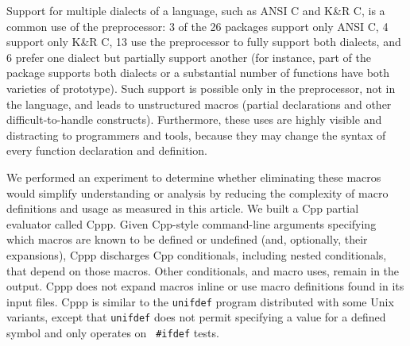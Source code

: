\documentclass[10pt]{article}
\def\typeofdocument{article}    %
\def\numpackages{26}
\newcommand{\pkg}[1]{\textsf{#1}}
\begin{document}

%

Support for multiple dialects of a language, such as ANSI C and K\&R C, is
a common use of the preprocessor:  3 of the {\numpackages} packages support
only ANSI C, 4 support only K\&R C, 13 use the preprocessor to fully
support both dialects, and 6 prefer one dialect but partially support
another (for instance, part of the package supports both dialects or a
substantial number of functions have both varieties of prototype).  Such
support is possible only in the preprocessor, not in the language, and
leads to unstructured macros (partial declarations and other
difficult-to-handle constructs).  Furthermore, these uses are highly
visible and distracting to programmers and tools, because they may change
the syntax of every function declaration and definition.



We performed an experiment to determine whether eliminating these macros
would simplify understanding or analysis by reducing the complexity of
macro definitions and usage as measured in this \typeofdocument.  We built
a Cpp partial evaluator called Cppp.  Given Cpp-style command-line
arguments specifying which macros are known to be defined or undefined
(and, optionally, their expansions), Cppp discharges Cpp conditionals,
including nested conditionals, that depend on those macros.  Other
conditionals, and macro uses, remain in the output.  Cppp does not expand
macros inline or use macro definitions found in its input files.  Cppp is
similar to the {\tt unifdef} program distributed with some Unix variants,
except that {\tt unifdef} does not
permit specifying a value for a defined symbol and only operates on {\tt
\#ifdef} tests.
\end{document}
